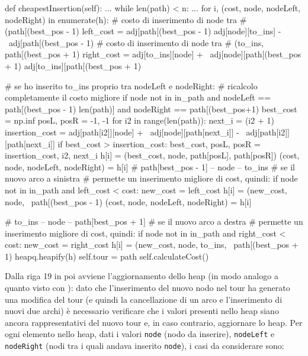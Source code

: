 \documentclass[a4paper,12pt]{report}
\begin{document}
\begin{python}
def cheapestInsertion(self):
  ...
  while len(path) < n:
    ...
    for i, (cost, node, nodeLeft, nodeRight) in enumerate(h):
      # costo di inserimento di node tra
      # (path[(best_pos - 1) %
      left_cost = adj[path[(best_pos - 1) %
                  adj[node][to_ins] - \
                  adj[path[(best_pos - 1) %
      # costo di inserimento di node tra 
      # (to_ins, path[(best_pos + 1) %
      right_cost = adj[to_ins][node] + \
                   adj[node][path[(best_pos + 1) %
                   adj[to_ins][path[(best_pos + 1) %

      # se ho inserito to_ins proprio tra nodeLeft e nodeRight:
      # ricalcolo completamente il costo migliore
      if node not in in_path and nodeLeft == path[(best_pos - 1) %
        len(path)] and nodeRight == path[(best_pos+1) %
        best_cost = np.inf
        posL, posR = -1, -1
        for i2 in range(len(path)):
          next_i = (i2 + 1) %
          insertion_cost = adj[path[i2]][node] + \
                           adj[node][path[next_i]] - \
                           adj[path[i2]][path[next_i]]
          if best_cost > insertion_cost:
            best_cost, posL, posR = insertion_cost, i2, next_i
        h[i] = (best_cost, node, path[posL], path[posR])
        (cost, node, nodeLeft, nodeRight) = h[i]
      # path[best_pos - 1] -- node -- to_ins
      # se il nuovo arco a sinistra
      # permette un inserimento migliore di cost, quindi:
      if node not in in_path and left_cost < cost:
        new_cost = left_cost
        h[i] = (new_cost, node, \
                path[(best_pos - 1) %
        (cost, node, nodeLeft, nodeRight) = h[i]

      # to_ins -- node -- path[best_pos + 1] 
      # se il nuovo arco a destra
      # permette un inserimento migliore di cost, quindi:
      if node not in in_path and right_cost < cost:
        new_cost = right_cost
        h[i] = (new_cost, node, to_ins, \
                path[(best_pos + 1) %
    heapq.heapify(h)
  self.tour = path
  self.calculateCost()
\end{python}
Dalla riga 19 in poi avviene l'aggiornamento dello heap (in modo analogo a quanto visto con ): dato che l'inserimento del nuovo nodo nel tour ha generato una modifica del tour (e quindi la cancellazione di un arco e l'inserimento di nuovi due archi) è necessario verificare che i valori presenti nello heap siano ancora rappresentativi del nuovo tour e, in caso contrario, aggiornare lo heap. Per ogni elemento nello heap, dati i valori \lstinline!node! (nodo da inserire), \lstinline!nodeLeft! e \lstinline!nodeRight! (nodi tra i quali andava inserito \lstinline!node!), i casi da considerare sono:
\end{document}
